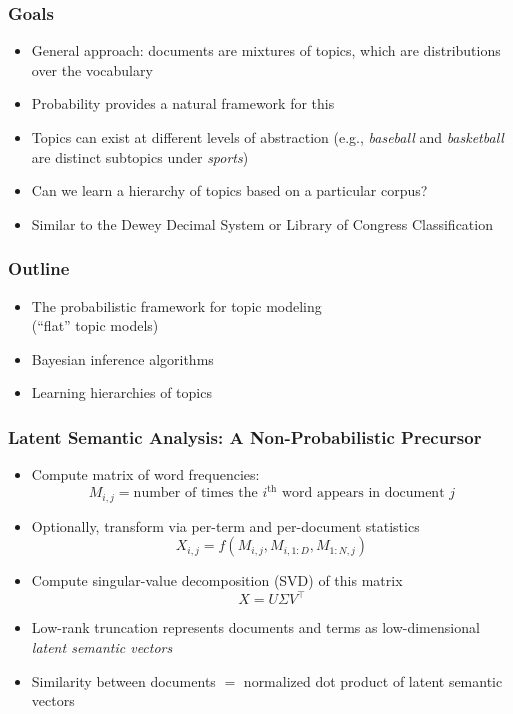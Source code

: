 \documentclass{beamer}
\newcommand{\nth}{^{\text{th}}}
\begin{document}
\begin{frame}
\frametitle{Goals}
\begin{itemize}[<+->]
\item General approach: documents are mixtures of topics, which are distributions over the vocabulary
\item Probability provides a natural framework for this
\item Topics can exist at different levels of abstraction (e.g., \emph{baseball} and \emph{basketball} are distinct subtopics under \emph{sports})
\item Can we learn a hierarchy of topics based on a particular corpus?
\item Similar to the Dewey Decimal System or Library of Congress Classification
\end{itemize}
\end{frame}

\begin{frame}
\frametitle{Outline}
\begin{itemize}[<+->]
\item The probabilistic framework for topic modeling \\ (``flat'' topic models)
\item Bayesian inference algorithms
\item Learning hierarchies of topics
\end{itemize}
\end{frame}

\begin{frame}
\frametitle{Latent Semantic Analysis: A Non-Probabilistic Precursor}
\begin{itemize}[<+->]
\item Compute matrix of word frequencies:
\[ M_{i,j} = \text{number of times the $i\nth$ word appears in document $j$} \]
\item Optionally, transform via per-term and per-document statistics
\[ X_{i,j} = f(M_{i,j}, M_{i,1:D}, M_{1:N,j}) \]
\item Compute singular-value decomposition (SVD) of this matrix
\[ X = U \Sigma V^\top \]
\item Low-rank truncation represents documents and terms as low-dimensional \emph{latent semantic vectors}
\item Similarity between documents $=$ normalized dot product of latent semantic vectors
\end{itemize}
\end{frame}
\end{document}

